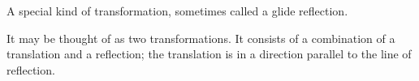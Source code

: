 A special kind of transformation, sometimes called a glide reflection.
\par
It may be thought of as two transformations.  
It consists of a combination of a translation and a reflection; the translation 
is in a direction parallel to the line of reflection.